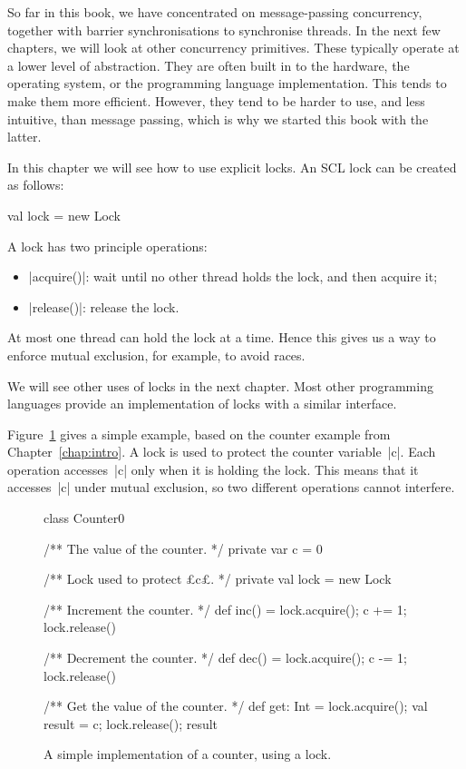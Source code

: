 So far in this book, we have concentrated on message-passing concurrency,
together with barrier synchronisations to synchronise threads.  In the next
few chapters, we will look at other concurrency primitives.  These typically
operate at a lower level of abstraction.  They are often built in to the
hardware, the operating system, or the programming language implementation.
This tends to make them more efficient.  However, they tend to be harder to
use, and less intuitive, than message passing, which is why we started this
book with the latter.

In this chapter we will see how to use explicit locks.  An SCL lock can be
created as follows:
%
\begin{scala}
  val lock = new Lock
\end{scala}

A lock has two principle operations:
%
\begin{itemize}
\item |acquire()|: wait until no other thread holds the lock, and then acquire
  it;

\item |release()|: release the lock.
\end{itemize}
%
At most one thread can hold the lock at a time.  Hence this gives us a way to
enforce mutual exclusion, for example, to avoid races.

We will see other uses of locks in the next chapter. 
%
Most other programming languages provide an implementation of locks with a
similar interface.

Figure~\ref{fig:counter-lock0} gives a simple example, based on the counter
example from Chapter~\ref{chap:intro}.  A lock is used to protect the counter
variable~|c|.  Each operation accesses~|c| only when it is holding the lock.
This means that it accesses~|c| under mutual exclusion, so two different
operations cannot interfere.


\begin{figure}
\begin{scala}
class Counter0{
  /** The value of the counter. */
  private var c = 0

  /** Lock used to protect £c£. */
  private val lock = new Lock

  /** Increment the counter. */
  def inc() = { lock.acquire(); c += 1; lock.release() }

  /** Decrement the counter. */
  def dec() = { lock.acquire(); c -= 1; lock.release() }

  /** Get the value of the counter. */
  def get: Int = { lock.acquire(); val result = c; lock.release(); result }
}
\end{scala}
\caption{A simple implementation of a counter, using a lock.}
\label{fig:counter-lock0}
\end{figure}

